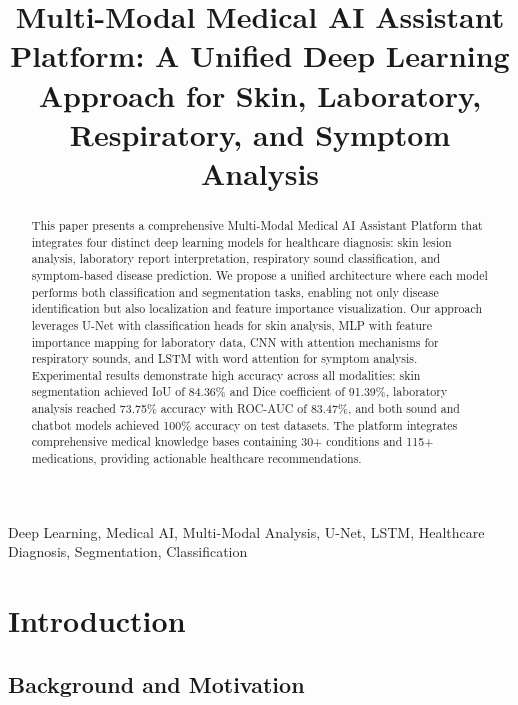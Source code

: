 \documentclass[conference]{IEEEtran}
\begin{document}
\title{Multi-Modal Medical AI Assistant Platform: A Unified Deep Learning Approach for Skin, Laboratory, Respiratory, and Symptom Analysis}

\author{
}

\maketitle

\begin{abstract}
This paper presents a comprehensive Multi-Modal Medical AI Assistant Platform that integrates four distinct deep learning models for healthcare diagnosis: skin lesion analysis, laboratory report interpretation, respiratory sound classification, and symptom-based disease prediction. We propose a unified architecture where each model performs both classification and segmentation tasks, enabling not only disease identification but also localization and feature importance visualization. Our approach leverages U-Net with classification heads for skin analysis, MLP with feature importance mapping for laboratory data, CNN with attention mechanisms for respiratory sounds, and LSTM with word attention for symptom analysis. Experimental results demonstrate high accuracy across all modalities: skin segmentation achieved IoU of 84.36\% and Dice coefficient of 91.39\%, laboratory analysis reached 73.75\% accuracy with ROC-AUC of 83.47\%, and both sound and chatbot models achieved 100\% accuracy on test datasets. The platform integrates comprehensive medical knowledge bases containing 30+ conditions and 115+ medications, providing actionable healthcare recommendations.
\end{abstract}

\begin{IEEEkeywords}
Deep Learning, Medical AI, Multi-Modal Analysis, U-Net, LSTM, Healthcare Diagnosis, Segmentation, Classification
\end{IEEEkeywords}

\section{Introduction}

\subsection{Background and Motivation}
\end{document}
